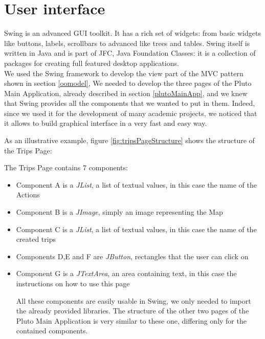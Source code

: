\section{User interface}\label{interface}

Swing is an advanced GUI toolkit. It has a rich set of widgets:
from basic widgets like buttons, labels, scrollbars to advanced like trees and tables. 
Swing itself is written in Java and is part of JFC, Java Foundation Classes: it is a collection of packages for creating full featured desktop applications.
\\

We used the Swing framework to develop the view part of the MVC pattern shown in section \ref{oomodel},
We needed to develop the three pages of the Pluto Main Application, already described in section \ref{plutoMainApp}, and we knew that Swing provides all the components that we wanted to put in them.
Indeed, since we used it for the development of many academic projects, we noticed that it allows to build graphical interface in a very fast and easy way.

As an illustrative example, figure \ref{fig:tripsPageStructure} shows the structure of the Trips Page:


The Trips Page contains 7 components:

\begin{itemize}
\item {Component A is a \textit{JList}, a list of textual values, in this case the name of the Actions}
\item {Component B is a \textit{JImage}, simply an image representing the Map}
\item {Component C is a \textit{JList}, a list of textual values, in this case the name of the created trips}
\item {Components D,E and F are \textit{JButton}, rectangles that the user can click on}
\item {Component G is a \textit{JTextArea}, an area containing text, in this case the instructions on how to use this page}

All these components are easily usable in Swing, we only needed to import the already provided libraries.
The structure of the other two pages of the Pluto Main Application is very similar to these one, differing only for the contained components.

\end{itemize}


